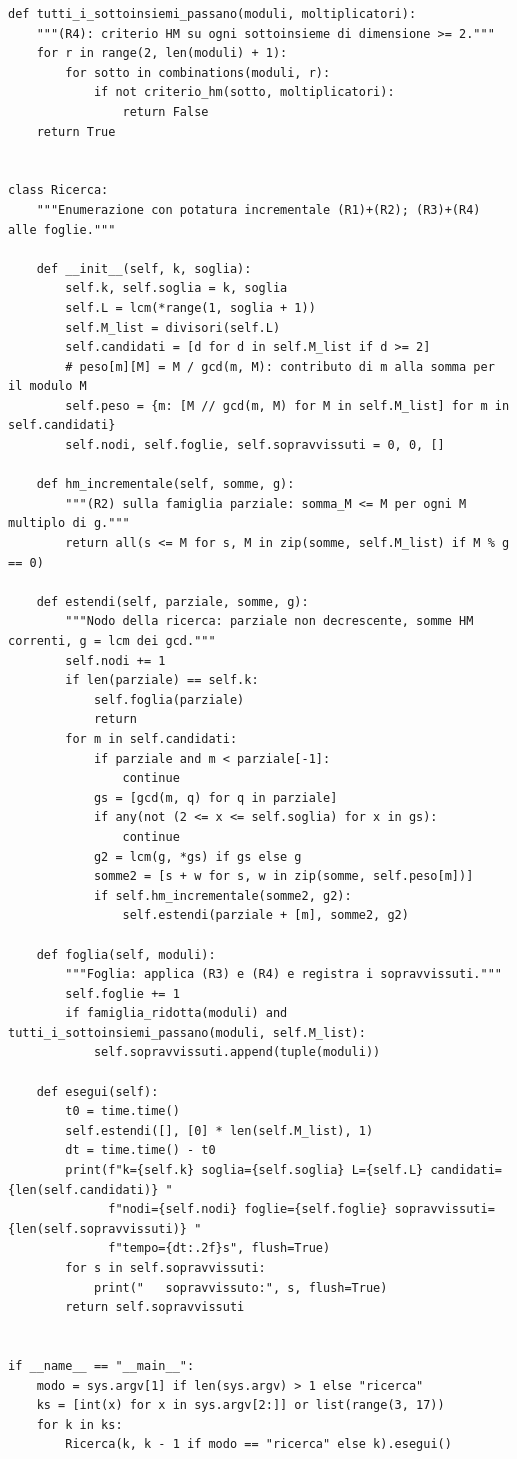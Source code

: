 \documentclass[11pt,a4paper]{article}
\begin{document}
\begin{lstlisting}[caption={attempt\_001 code\_1 [python, rigore exact] — Stage A (certificate): enumerate non-decreasing k-tuples of divisors of L\_k with pairwise  — verdetto del Referee: UNKNOWN\_STATUS}]
def tutti_i_sottoinsiemi_passano(moduli, moltiplicatori):
    """(R4): criterio HM su ogni sottoinsieme di dimensione >= 2."""
    for r in range(2, len(moduli) + 1):
        for sotto in combinations(moduli, r):
            if not criterio_hm(sotto, moltiplicatori):
                return False
    return True


class Ricerca:
    """Enumerazione con potatura incrementale (R1)+(R2); (R3)+(R4) alle foglie."""

    def __init__(self, k, soglia):
        self.k, self.soglia = k, soglia
        self.L = lcm(*range(1, soglia + 1))
        self.M_list = divisori(self.L)
        self.candidati = [d for d in self.M_list if d >= 2]
        # peso[m][M] = M / gcd(m, M): contributo di m alla somma per il modulo M
        self.peso = {m: [M // gcd(m, M) for M in self.M_list] for m in self.candidati}
        self.nodi, self.foglie, self.sopravvissuti = 0, 0, []

    def hm_incrementale(self, somme, g):
        """(R2) sulla famiglia parziale: somma_M <= M per ogni M multiplo di g."""
        return all(s <= M for s, M in zip(somme, self.M_list) if M % g == 0)

    def estendi(self, parziale, somme, g):
        """Nodo della ricerca: parziale non decrescente, somme HM correnti, g = lcm dei gcd."""
        self.nodi += 1
        if len(parziale) == self.k:
            self.foglia(parziale)
            return
        for m in self.candidati:
            if parziale and m < parziale[-1]:
                continue
            gs = [gcd(m, q) for q in parziale]
            if any(not (2 <= x <= self.soglia) for x in gs):
                continue
            g2 = lcm(g, *gs) if gs else g
            somme2 = [s + w for s, w in zip(somme, self.peso[m])]
            if self.hm_incrementale(somme2, g2):
                self.estendi(parziale + [m], somme2, g2)

    def foglia(self, moduli):
        """Foglia: applica (R3) e (R4) e registra i sopravvissuti."""
        self.foglie += 1
        if famiglia_ridotta(moduli) and tutti_i_sottoinsiemi_passano(moduli, self.M_list):
            self.sopravvissuti.append(tuple(moduli))

    def esegui(self):
        t0 = time.time()
        self.estendi([], [0] * len(self.M_list), 1)
        dt = time.time() - t0
        print(f"k={self.k} soglia={self.soglia} L={self.L} candidati={len(self.candidati)} "
              f"nodi={self.nodi} foglie={self.foglie} sopravvissuti={len(self.sopravvissuti)} "
              f"tempo={dt:.2f}s", flush=True)
        for s in self.sopravvissuti:
            print("   sopravvissuto:", s, flush=True)
        return self.sopravvissuti


if __name__ == "__main__":
    modo = sys.argv[1] if len(sys.argv) > 1 else "ricerca"
    ks = [int(x) for x in sys.argv[2:]] or list(range(3, 17))
    for k in ks:
        Ricerca(k, k - 1 if modo == "ricerca" else k).esegui()

\end{lstlisting}
\end{document}
